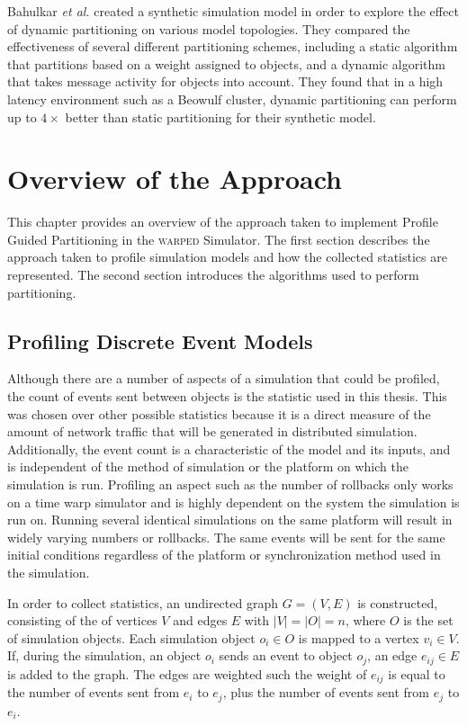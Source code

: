 \documentclass[11pt]{book}
\begin{document}
Bahulkar \emph{et al.} created a synthetic simulation model in order to explore the effect of dynamic partitioning on various model topologies. They compared the effectiveness of several different partitioning schemes, including a static algorithm that partitions based on a weight assigned to objects, and a dynamic algorithm that takes message activity for objects into account. They found that in a high latency environment such as a Beowulf cluster, dynamic partitioning can perform up to \(4\times\) better than static partitioning for their synthetic model.


\chapter{Overview of the Approach}\label{overview}

This chapter provides an overview of the approach taken to implement Profile Guided Partitioning in the \textsc{warped} Simulator. The first section describes the approach taken to profile simulation models and how the collected statistics are represented. The second section introduces the algorithms used to perform partitioning.

\section{Profiling Discrete Event Models}

Although there are a number of aspects of a simulation that could be profiled, the count of events sent between objects is the statistic used in this thesis. This was chosen over other possible statistics because it is a direct measure of the amount of network traffic that will be generated in distributed simulation. Additionally, the event count is a characteristic of the model and its inputs, and is independent of the method of simulation or the platform on which the simulation is run. Profiling an aspect such as the number of rollbacks only works on a time warp simulator and is highly dependent on the system the simulation is run on. Running several identical simulations on the same platform will result in widely varying numbers or rollbacks. The same events will be sent for the same initial conditions regardless of the platform or synchronization method used in the simulation.

In order to collect statistics, an undirected graph \(G=(V,E)\) is constructed, consisting of the of vertices \(V\) and edges \(E\) with \(|V| = |O| = n\), where \(O\) is the set of simulation objects. Each simulation object \(o_i \in O\) is mapped to a vertex \(v_i \in V\). If, during the simulation, an object \(o_i\) sends an event to object \(o_j\), an edge \(e_{ij} \in E\) is added to the graph. The edges are weighted such the weight of \(e_{ij}\) is equal to the number of events sent from \(e_i\) to \(e_j\), plus the number of events sent from \(e_j\) to \(e_i\).
\end{document}
